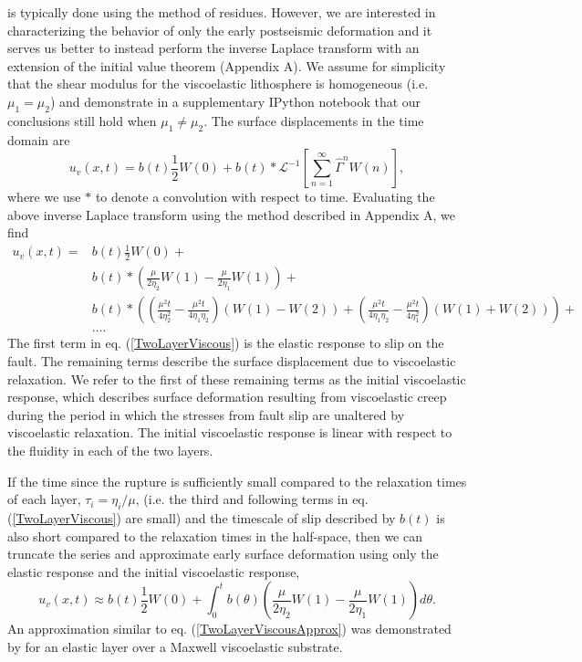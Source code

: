 \documentclass[extra,mreferee]{gji}
\begin{document}
is typically done using the method of residues. However, we are
interested in characterizing the behavior of only the early
postseismic deformation and it serves us better to instead perform the
inverse Laplace transform with an extension of the initial value
theorem (Appendix A). We assume for simplicity that the shear modulus
for the viscoelastic lithosphere is homogeneous (i.e. $\mu_1 = \mu_2$)
and demonstrate in a supplementary IPython notebook that our
conclusions still hold when $\mu_1 \neq \mu_2$.  The surface
displacements in the time domain are
\begin{equation}
 u_v(x,t) = b(t)\frac{1}{2}W(0) + 
            b(t)\ast\mathcal{L}^{-1}\left[\sum_{n=1}^\infty\hat{\Gamma}^{n}W(n)\right],
\end{equation}
where we use $*$ to denote a convolution with respect to time.
Evaluating the above inverse Laplace transform using the method
described in Appendix A, we find
\begin{align}\label{TwoLayerViscous}
  u_v(x,t) = &b(t)\frac{1}{2}W(0) +\nonumber\\
             &b(t)\ast\left(\frac{\mu}{2\eta_2}W(1) - \frac{\mu}{2\eta_1}W(1)\right) +\nonumber\\
             &b(t)\ast\left(\left(\frac{\mu^2t}{4\eta_2^2} -
                  \frac{\mu^2t}{4\eta_1\eta_2}\right) \left(W(1) - W(2)\right) +
                  \left(\frac{\mu^2t}{4\eta_1\eta_2} - \frac{\mu^2t}{4\eta_1^2}\right)
                  \left(W(1) + W(2)\right)\right) + \nonumber\\ 
             &\dots.
\end{align}
The first term in eq. (\ref{TwoLayerViscous}) is the elastic response
to slip on the fault.  The remaining terms describe the surface
displacement due to viscoelastic relaxation.  We refer to the first of
these remaining terms as the initial viscoelastic response, which
describes surface deformation resulting from viscoelastic creep during
the period in which the stresses from fault slip are unaltered by
viscoelastic relaxation.  The initial viscoelastic response is linear
with respect to the fluidity in each of the two layers.

If the time since the rupture is sufficiently small compared to the
relaxation times of each layer, $\tau_i=\eta_i/\mu$, (i.e. the third
and following terms in eq. (\ref{TwoLayerViscous}) are small) and the
timescale of slip described by $b(t)$ is also short compared to the
relaxation times in the half-space, then we can truncate the series and
approximate early surface deformation using only the elastic response
and the initial viscoelastic response,
\begin{equation}\label{TwoLayerViscousApprox}
 u_v(x,t) \approx b(t)\frac{1}{2}W(0) + 
          \int_0^t b(\theta)\left(\frac{\mu}{2\eta_2}W(1) - 
                  \frac{\mu}{2\eta_1}W(1)\right)d\theta.
\end{equation} 
An approximation similar to eq. (\ref{TwoLayerViscousApprox}) was
demonstrated by \citet{S2010} for an elastic layer over a Maxwell
viscoelastic substrate. 
\end{document}
